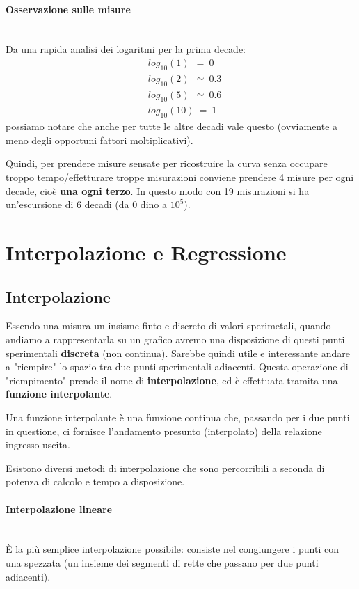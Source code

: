 \documentclass[a4paper,11pt]{report}
\begin{document}
\paragraph{Osservazione sulle misure}~\\
Da una rapida analisi dei logaritmi per la prima decade:
\begin{align*}
&log_{10}(1)~~ = ~0\\
&log_{10}(2)~~ \simeq~ 0.3\\
&log_{10}(5)~~ \simeq~ 0.6\\
&log_{10}(10)~ =~ 1
\end{align*}
possiamo notare che anche per tutte le altre decadi vale questo (ovviamente a meno degli opportuni fattori moltiplicativi).

Quindi, per prendere misure sensate per ricostruire la curva senza occupare troppo tempo/effetturare troppe misurazioni conviene prendere 4 misure per ogni decade, cioè \textbf{una ogni terzo}. In questo modo con 19 misurazioni si ha un'escursione di 6 decadi (da 0 dino a $10^5$). 
\section{Interpolazione e Regressione}
\subsection{Interpolazione}
\label{interpolazione}
Essendo una misura un insisme finto e discreto di valori sperimetali, quando andiamo a rappresentarla su un grafico avremo una disposizione di questi punti sperimentali \textbf{discreta} (non continua). Sarebbe quindi utile e interessante andare a "riempire" lo spazio tra due punti sperimentali adiacenti. Questa operazione di "riempimento" prende il nome di \textbf{interpolazione}, ed è effettuata tramita una \textbf{funzione interpolante}.

Una funzione interpolante è una funzione continua che, passando per i due punti in questione, ci fornisce l'andamento presunto (interpolato) della relazione ingresso-uscita.

Esistono diversi metodi di interpolazione che sono percorribili a seconda di potenza di calcolo e tempo a disposizione.
\paragraph{Interpolazione lineare}~\\
È la più semplice interpolazione possibile: consiste nel congiungere i punti con una spezzata (un insieme dei segmenti di rette che passano per due punti adiacenti).
\end{document}
